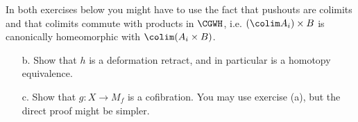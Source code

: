 \begin{remark}
		In both exercises below you might have to use the fact that pushouts are colimits and that colimits commute with products in $\CGWH$, i.e. $(\colim A_i)\times B$ is canonically homeomorphic with $\colim(A_i \times B)$.
\end{remark}
\begin{exercise}\leavevmode
	\begin{enumerate}
		\item[b.] Show that $h$ is a deformation retract, and in particular is a homotopy equivalence.\label{exer:1.2.a}
		\item[c.] Show that $g : X \to M_f$ is a cofibration. You may use exercise (a), but the direct proof might be simpler.
	\end{enumerate}
\end{exercise}

